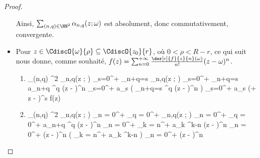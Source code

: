 \begin{proof}
\begin{itemize}
		\noindent
		Ainsi,
		$\sum_{(n,q) \in \NN^2} \alpha_{n,q}(z ; \omega)$
		est absolument, donc commutativement, convergente.
	

		\item Pour $z \in \CdiscO{\omega}{\rho} \subseteq \CdiscO{z_0}{r}$, où $0 < \rho < R - r$, ce qui suit nous donne, comme souhaité,
		$f(z) = \sum_{n = 0}^{+\infty} \frac{\der[e]{f}{z}{n}(\omega)}{n!} (z - \omega)^n$.

        \begin{multicols}{2}
        	\setlength{\columnseprule}{.75pt}
	        \begin{enumerate}[wide]
    			\item
        		\begin{stepcalc}[style=ar*]
        			\dsum_{(n,q) \in \NN^2} \alpha_{n,q}(z ; \omega)
        		\explnext{}
        			\dsum_{s=0}^{+\infty} \dsum_{n+q=s} \alpha_{n,q}(z ; \omega)
        		\explnext{}
        			\dsum_{s=0}^{+\infty} \dsum_{n+q=s}  a_{n+q} \omega^q (z - \omega)^n
        		\explnext{}
        			\dsum_{s=0}^{+\infty} a_s \big( \dsum_{n+q=s}  \omega^q (z - \omega)^n \big)
        		\explnext{}
        			\dsum_{s=0}^{+\infty} a_s (\omega + z - \omega)^s
        		\explnext{}
        			f(z)
        		\end{stepcalc}


    			\item
        		\begin{stepcalc}[style=ar*]
        			\dsum_{(n,q) \in \NN^2} \alpha_{n,q}(z ; \omega)
        		\explnext{}
        			\dsum_{n = 0}^{+\infty} \dsum_{q = 0}^{+\infty} \alpha_{n,q}(z ; \omega)
        		\explnext{}
        			\dsum_{n = 0}^{+\infty} \dsum_{q = 0}^{+\infty}  a_{n+q} \omega^q (z - \omega)^n
        		\explnext{}
        			\dsum_{n = 0}^{+\infty} \dsum_{k = n}^{+\infty}  a_{k} \omega^{k-n} (z - \omega)^n
        		\explnext{}
        			\dsum_{n = 0}^{+\infty}  (z - \omega)^n \big( \dsum_{k = n}^{+\infty}  a_{k} \omega^{k-n} \big) 
        		\explnext{}
        			\dsum_{n = 0}^{+\infty}  (z - \omega)^n
        		\end{stepcalc}
    		\end{enumerate}
	\end{multicols}
	\end{itemize}

	\null\vspace{-8ex}
\end{proof}


